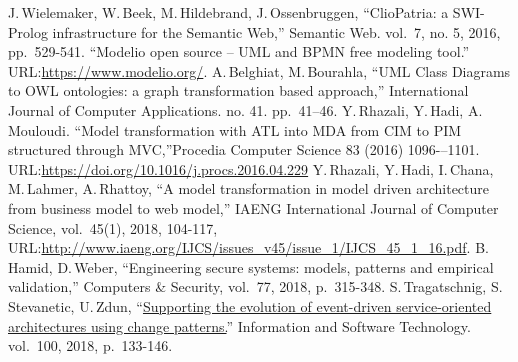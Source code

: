 \documentclass[conference]{IEEEtran}
\begin{document}
\begin{thebibliography}{99}
 J.\,Wielemaker, W.\,Beek, M.\,Hildebrand, J.\,Ossenbruggen, ``ClioPatria: a SWI-Prolog infrastructure for the Semantic Web,'' Semantic Web. vol.~7, no. 5, 2016, pp.~529-541. %
 ``Modelio open source -- UML and BPMN free modeling tool.'' URL:\url{https://www.modelio.org/}.
 A.\,Belghiat, M.\,Bourahla, ``UML Class Diagrams to OWL ontologies: a graph transformation based approach,'' International Journal of Computer Applications. no. 41. pp.~41--46. %
Y.\,Rhazali, Y.\,Hadi, A.\,Mouloudi. ``Model transformation with ATL into MDA from CIM to PIM structured through MVC,''Procedia Computer Science 83 (2016) 1096-–1101. URL:\url{https://doi.org/10.1016/j.procs.2016.04.229}
 Y.\,Rhazali, Y.\,Hadi, I.\,Chana, M.\,Lahmer, A.\,Rhattoy, ``A model
 transformation in model driven architecture from business model to web
 model,'' IAENG International Journal of Computer Science, vol.~45(1), 2018, 104-117, URL:\url{http://www.iaeng.org/IJCS/issues_v45/issue_1/IJCS_45_1_16.pdf}.
 B.\,Hamid, D.\,Weber, ``Engineering secure systems: models, patterns and empirical validation,'' Computers \& Security,  vol.~77, 2018, p.~315-348.
  S.\,Tragatschnig, S.\,Stevanetic, U.\,Zdun, ``\href{https://www.sciencedirect.com/science/article/abs/pii/S0950584916303251}{Supporting the  evolution of event-driven service-oriented architectures using change  patterns.}'' Information and Software Technology. vol.~100, 2018, p.~133-146. %

\end{thebibliography}
\end{document}
